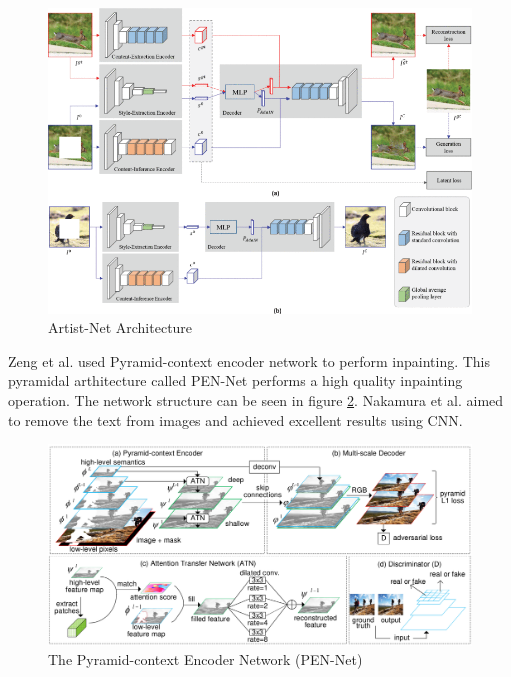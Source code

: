 \begin{figure}[h]
    \centering
    \includegraphics[width=14cm]{figures/chapter4/artist.png}
    \vspace*{4mm}
    \caption{Artist-Net Architecture \cite{artistNet}}
    \label{fig:artistNet}
\end{figure}

Zeng et al. \cite{pyramid_network} used Pyramid-context encoder network to perform inpainting. This pyramidal arthitecture called PEN-Net performs a high quality inpainting operation. The network structure can be seen in figure \ref{fig:pennet}. Nakamura et al. \cite{nakamura} aimed to remove the text from images and achieved excellent results using CNN. 

\begin{figure}[h]
    \centering
    \includegraphics[width=14cm]{figures/chapter4/pyramid.png}
    \vspace*{5mm}
    \caption{The Pyramid-context Encoder Network (PEN-Net) \cite{pyramid_network}}
    \label{fig:pennet}
\end{figure}

